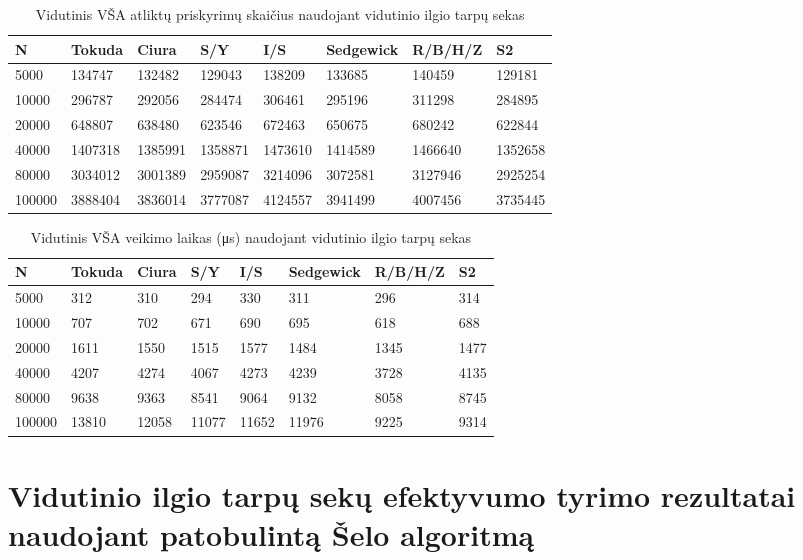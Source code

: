 \documentclass{VUMIFInfKursinis}
\begin{document}
\begin{table}[H]
  \caption{Vidutinis VŠA atliktų priskyrimų skaičius naudojant vidutinio ilgio tarpų sekas}
  \label{tss_medium_assignments}
  \begin{tabular}{|l|l|l|l|l|l|l|l|}
  \hline
  N      & Tokuda  & Ciura   & S/Y     & I/S     & Sedgewick & R/B/H/Z & S2     \\ \hline
  5000   & 134747  & 132482  & 129043  & 138209  & 133685    & 140459  & 129181  \\ \hline
  10000  & 296787  & 292056  & 284474  & 306461  & 295196    & 311298  & 284895  \\ \hline
  20000  & 648807  & 638480  & 623546  & 672463  & 650675    & 680242  & 622844  \\ \hline
  40000  & 1407318 & 1385991 & 1358871 & 1473610 & 1414589   & 1466640 & 1352658 \\ \hline
  80000  & 3034012 & 3001389 & 2959087 & 3214096 & 3072581   & 3127946 & 2925254 \\ \hline
  100000 & 3888404 & 3836014 & 3777087 & 4124557 & 3941499   & 4007456 & 3735445 \\ \hline
  \end{tabular}
\end{table}

\begin{table}[H]
  \caption{Vidutinis VŠA veikimo laikas (μs) naudojant vidutinio ilgio tarpų sekas}
  \label{tss_medium_runtimes}
  \begin{tabular}{|l|l|l|l|l|l|l|l|}
  \hline
  N      & Tokuda & Ciura & S/Y   & I/S   & Sedgewick & R/B/H/Z & S2  \\ \hline
  5000   & 312    & 310   & 294   & 330   & 311       & 296     & 314  \\ \hline
  10000  & 707    & 702   & 671   & 690   & 695       & 618     & 688  \\ \hline
  20000  & 1611   & 1550  & 1515  & 1577  & 1484      & 1345    & 1477 \\ \hline
  40000  & 4207   & 4274  & 4067  & 4273  & 4239      & 3728    & 4135 \\ \hline
  80000  & 9638   & 9363  & 8541  & 9064  & 9132      & 8058    & 8745 \\ \hline
  100000 & 13810  & 12058 & 11077 & 11652 & 11976     & 9225    & 9314 \\ \hline
  \end{tabular}
\end{table}

\section{Vidutinio ilgio tarpų sekų efektyvumo tyrimo rezultatai naudojant patobulintą Šelo algoritmą}
\end{document}

